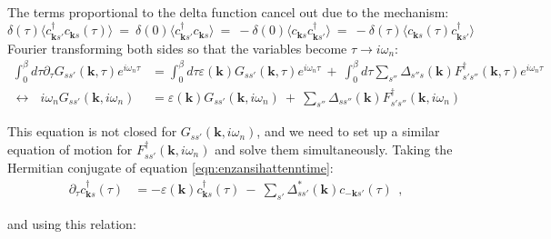 \documentclass[a4j]{jsarticle}
\begin{document}
The terms proportional to the delta function cancel out due to the mechanism:
$$
	\delta ( \tau )
	\langle c_{\bm{k} s'}^{\dagger} c_{\bm{k}s}(\tau) \rangle
	\ = \
	\delta ( 0 )
	\langle c_{\bm{k} s'}^{\dagger} c_{\bm{k}s} \rangle
	\ = \
	-
	\delta ( 0 )
	\langle c_{\bm{k}s} c_{\bm{k} s'}^{\dagger} \rangle
	\ = \
	-
	\delta ( \tau )
	\langle c_{\bm{k}s}(\tau) c_{\bm{k} s'}^{\dagger} \rangle
$$
Fourier transforming both sides so that the variables become $\tau \to i \omega_{n}$:
\begin{align}
	\int^{\beta}_{0} d \tau
	\partial_{\tau}
	G_{ss'}(\bm{k} , \tau)
	e^{i \omega_{n} \tau}
	 & =
	\int^{\beta}_{0} d \tau
	\varepsilon( \bm{k} )
	G_{ss'}(\bm{k} , \tau)
	e^{i \omega_{n} \tau}
	\ + \
	\int^{\beta}_{0} d \tau
	\sum_{s''}
	\Delta_{ s'' s }( \bm{k} )
	F_{ s' s'' }^{\dagger} ( \bm{k} , \tau)
	e^{i \omega_{n} \tau}
	\nonumber \\[2mm]
	\longleftrightarrow \ \ \
	i \omega_{n}
	G_{ss'}(\bm{k} , i \omega_{n} )
	 & =
	\varepsilon( \bm{k} )
	G_{ss'}(\bm{k} , i \omega_{n} )
	\ + \
	\sum_{s''}
	\Delta_{ s s'' }( \bm{k} )
	F_{ s' s'' }^{\dagger} ( \bm{k} , i \omega_{n} )
\end{align}

This equation is not closed for $G_{ss'}(\bm{k} , i \omega_{n} )$, and we need to set up a similar equation of motion for $F_{ss'}^{\dagger}(\bm{k} , i \omega_{n} )$ and solve them simultaneously.
Taking the Hermitian conjugate of equation \ref{eqn:enzansihattenntime}:
\begin{align}
	\partial_{\tau}
	c_{\bm{k}s}^{\dagger} (\tau)
	 & =
	-
	\varepsilon( \bm{k} )
	c_{\bm{k} s}^{\dagger} (\tau)
	\ - \
	\sum_{ s' }
	\Delta_{ s s' }^{*} ( \bm{k} )
	c_{ - \bm{k} s'} ( \tau )
	\ \ ,
\end{align}

and using this relation:
\end{document}
